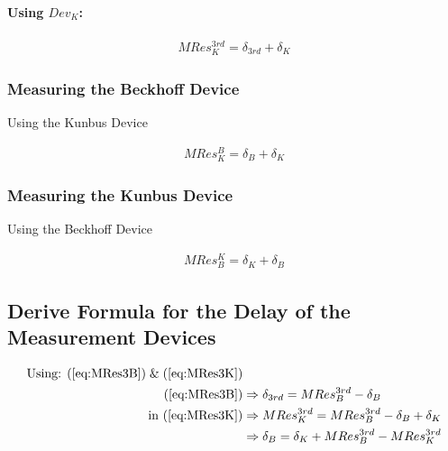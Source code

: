 \paragraph{Using $Dev_K$:}
\begin{equation}\begin{split}
\label{eq:MRes3K}
MRes_{K}^{3rd} = \delta_{3rd} + \delta_{K}
\end{split}\end{equation}



\subsubsection{Measuring the Beckhoff Device}
Using the Kunbus Device

\begin{equation}\begin{split}
\label{eq:MResBK}
MRes_{K}^{B} = \delta_{B} + \delta_{K}
\end{split}\end{equation}



\subsubsection{Measuring the Kunbus Device}
Using the Beckhoff Device

\begin{equation}\begin{split}
\label{eq:MResKB}
MRes_{B}^{K} = \delta_{K} + \delta_{B}
\end{split}\end{equation}




\subsection{Derive Formula for the Delay of the Measurement Devices}
\begin{align}%
\label{eq:deltaB}
\text{Using: } (\ref{eq:MRes3B})\;\&\;(\ref{eq:MRes3K}){}&\notag\\
(\ref{eq:MRes3B}) {}&\Rightarrow \delta_{3rd} = MRes_{B}^{3rd} - \delta_B\notag\\
\text{in } (\ref{eq:MRes3K}) {}&\Rightarrow MRes_{K}^{3rd} = MRes_{B}^{3rd} - \delta_B + \delta_K\notag\\
{}&\Rightarrow \delta_B = \delta_K + MRes_{B}^{3rd} - MRes_{K}^{3rd}
\end{align}

